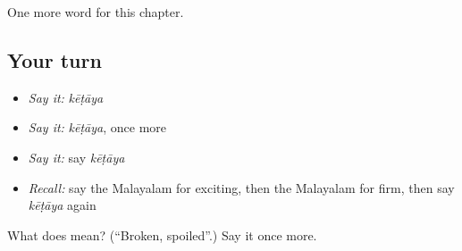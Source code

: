 \begin{grammarlens}[title={What you've built}]
One more word for this chapter.
\end{grammarlens}

\subsection*{Your turn}
\begin{itemize}
\raggedright
  \item \emph{Say it:} \emph{kēṭāya}
  \item \emph{Say it:} \emph{kēṭāya}, once more
  \item \emph{Say it:} say \emph{kēṭāya}
  \item \emph{Recall:} say the Malayalam for exciting, then the Malayalam for firm, then say \emph{kēṭāya} again
\end{itemize}

\begin{tcolorbox}[breakable,colback=teal!4,colframe=teal!35!black,title={Before you move on}]
What does  mean? (\textquotedblleft{}Broken, spoiled\textquotedblright{}.) Say it once more.
\end{tcolorbox}
